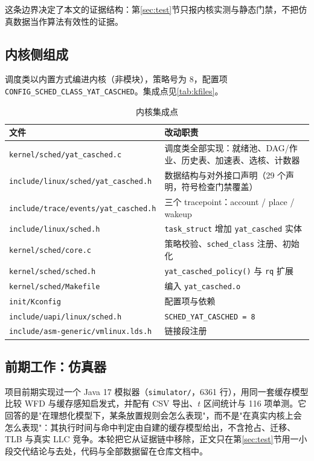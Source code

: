 这条边界决定了本文的证据结构：第\ref{sec:test}节只报内核实测与静态门禁，不把仿真数据当作算法有效性的证据。

\subsection{内核侧组成}

调度类以内置方式编进内核（非模块），策略号为 8，配置项 \texttt{CONFIG\_SCHED\_CLASS\_YAT\_CASCHED}。集成点见\autoref{tab:kfiles}。

\begin{table}[H]
\centering
\caption{内核集成点}
\label{tab:kfiles}
\small
\begin{tabular}{@{}p{5.6cm}p{8.4cm}@{}}
\toprule
文件 & 改动职责 \\
\midrule
\texttt{kernel/sched/yat\_casched.c} & 调度类全部实现：就绪池、DAG/作业、历史表、加速表、选核、计数器 \\
\texttt{include/linux/sched/yat\_casched.h} & 数据结构与对外接口声明（29 个声明，符号检查门禁覆盖） \\
\texttt{include/trace/events/yat\_casched.h} & 三个 tracepoint：account / place / wakeup \\
\texttt{include/linux/sched.h} & \texttt{task\_struct} 增加 \texttt{yat\_casched} 实体 \\
\texttt{kernel/sched/core.c} & 策略校验、\texttt{sched\_class} 注册、初始化 \\
\texttt{kernel/sched/sched.h} & \texttt{yat\_casched\_policy()} 与 \texttt{rq} 扩展 \\
\texttt{kernel/sched/Makefile} & 编入 \texttt{yat\_casched.o} \\
\texttt{init/Kconfig} & 配置项与依赖 \\
\texttt{include/uapi/linux/sched.h} & \texttt{SCHED\_YAT\_CASCHED = 8} \\
\texttt{include/asm-generic/vmlinux.lds.h} & 链接段注册 \\
\bottomrule
\end{tabular}
\end{table}

\subsection{前期工作：仿真器}

项目前期实现过一个 Java 17 模拟器（\texttt{simulator/}，6361 行），用同一套缓存模型比较 WFD 与缓存感知启发式，并配有 CSV 导出、$t$ 区间统计与 116 项单测。它回答的是"在理想化模型下，某条放置规则会怎么表现"，而不是"在真实内核上会怎么表现"：其执行时间与命中判定由自建的缓存模型给出，不含抢占、迁移、TLB 与真实 LLC 竞争。本轮把它从证据链中移除，正文只在第\ref{sec:test}节用一小段交代结论与去处，代码与全部数据留在仓库文档中。

